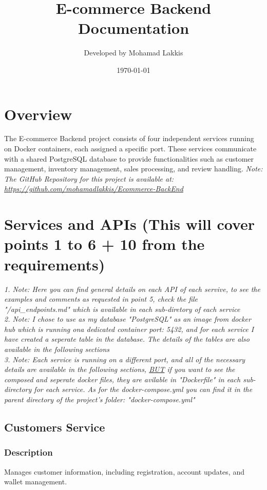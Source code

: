 \documentclass[a4paper,12pt]{article}
\title{E-commerce Backend Documentation}
\author{Developed by Mohamad Lakkis}
\date{\today}
\begin{document}
\maketitle

\tableofcontents
\newpage


\section{Overview}
The E-commerce Backend project consists of four independent services running on Docker containers, each assigned a specific port. These services communicate with a shared PostgreSQL database to provide functionalities such as customer management, inventory management, sales processing, and review handling.
\textit{Note: The GitHub Repository for this project is available at: \href{https://github.com/mohamadlakkis/Ecommerce-BackEnd}{https://github.com/mohamadlakkis/Ecommerce-BackEnd}}
\section{Services and APIs (This will cover points 1 to 6 + 10 from the requirements)}
\textit{1. Note: Here you can find general details on each API of each servive, to see the examples and comments as requested in point 5, check the file "/api\_endpoints.md" which is available in each sub-diretory of each service}\\
\textit{2. Note: I chose to use as my database "PostgreSQL" as an image from docker hub which is running ona dedicated container port: 5432, and for each service I have created a seperate table in the database. The details of the tables are also available in the following sections}\\
\textit{3. Note: Each service is running on a different port, and all of the necessary details are available in the following sections, \underline{BUT} if you want to see the composed and seperate docker files, they are avilable in "Dockerfile" in each sub-directory for each service. As for the docker-compose.yml you can find it in the parent directory of the project's folder: "docker-compose.yml"}

\subsection{Customers Service}
\subsubsection{Description}
Manages customer information, including registration, account updates, and wallet management.
\end{document}
